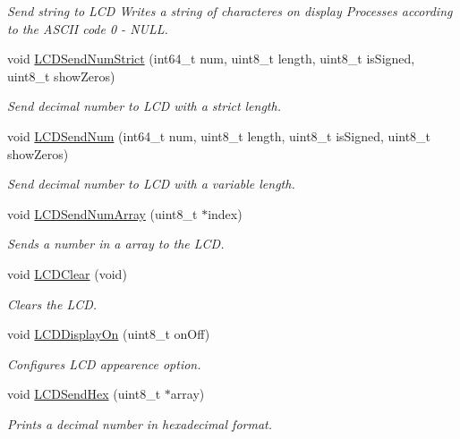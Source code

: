 \begin{DoxyCompactItemize}
\begin{DoxyCompactList}\small\item\em Send string to L\-C\-D Writes a string of characteres on display Processes according to the A\-S\-C\-I\-I code 0 -\/ N\-U\-L\-L. \end{DoxyCompactList}\item 
void \hyperlink{group__lcd__h_gac4b96faffdc9a846f1f2031a09935f07}{L\-C\-D\-Send\-Num\-Strict} (int64\-\_\-t num, uint8\-\_\-t length, uint8\-\_\-t is\-Signed, uint8\-\_\-t show\-Zeros)
\begin{DoxyCompactList}\small\item\em Send decimal number to L\-C\-D with a strict length. \end{DoxyCompactList}\item 
void \hyperlink{group__lcd__h_ga834f812058a0f9e13614e3877b99e7d1}{L\-C\-D\-Send\-Num} (int64\-\_\-t num, uint8\-\_\-t length, uint8\-\_\-t is\-Signed, uint8\-\_\-t show\-Zeros)
\begin{DoxyCompactList}\small\item\em Send decimal number to L\-C\-D with a variable length. \end{DoxyCompactList}\item 
void \hyperlink{group__lcd__h_gab60cf48616fbfae462176971827a642d}{L\-C\-D\-Send\-Num\-Array} (uint8\-\_\-t $\ast$index)
\begin{DoxyCompactList}\small\item\em Sends a number in a array to the L\-C\-D. \end{DoxyCompactList}\item 
void \hyperlink{group__lcd__h_ga3a94c0f44f76db891e66d98966f904e8}{L\-C\-D\-Clear} (void)
\begin{DoxyCompactList}\small\item\em Clears the L\-C\-D. \end{DoxyCompactList}\item 
void \hyperlink{group__lcd__h_gabeb4bea89bc174b16a527b8d9566d610}{L\-C\-D\-Display\-On} (uint8\-\_\-t on\-Off)
\begin{DoxyCompactList}\small\item\em Configures L\-C\-D appearence option. \end{DoxyCompactList}\item 
void \hyperlink{group__lcd__h_ga0178cd2ca404d1b5b126d43df79bd460}{L\-C\-D\-Send\-Hex} (uint8\-\_\-t $\ast$array)
\begin{DoxyCompactList}\small\item\em Prints a decimal number in hexadecimal format. \end{DoxyCompactList}\item 

\end{DoxyCompactItemize}
